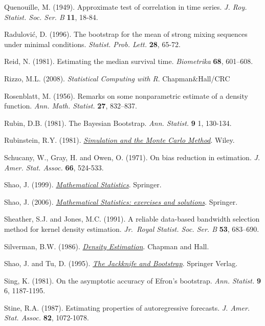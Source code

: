 \documentclass[
]{book}
\theoremstyle{break}
\theoremstyle{nonumberplain}
\begin{document}
Quenouille, M. (1949). Approximate test of correlation in time series.
\emph{J. Roy. Statist. Soc. Ser. B} \textbf{11}, 18-84.

Radulović, D. (1996). The bootstrap for the mean of strong mixing
sequences under minimal conditions. \emph{Statist. Prob. Lett.} \textbf{28},
65-72.

Reid, N. (1981). Estimating the median survival time. \emph{Biometrika}
\textbf{68}, 601--608.

Rizzo, M.L. (2008). \emph{Statistical Computing with R}. Chapman\&Hall/CRC

Rosenblatt, M. (1956). Remarks on some nonparametric estimate of a
density function. \emph{Ann. Math. Statist.} \textbf{27}, 832--837.

Rubin, D.B. (1981). The Bayesian Bootstrap. \emph{Ann. Statist.} \textbf{9} 1,
130-134.

Rubinstein, R.Y. (1981). \href{https://books.google.es/books?hl=es&lr=&id=r2VODQAAQBAJ&oi=fnd&pg=PR1&dq=Simulation+and+the+Monte+Carlo+Method}{\emph{Simulation and the Monte Carlo Method}}. Wiley.

Schucany, W., Gray, H. and Owen, O. (1971). On bias reduction in
estimation. \emph{J. Amer. Stat. Assoc.} \textbf{66}, 524-533.

Shao, J. (1999). \href{https://www.springer.com/gp/book/9780387953823}{\emph{Mathematical Statistics}}. Springer.

Shao, J. (2006). \href{http://www.stewartschultz.com/statistics/books/Mathematical\%20Statistics\%20-\%20Exercises\%20and\%20Solutions.pdf}{\emph{Mathematical Statistics: exercises and solutions}}. Springer.

Sheather, S.J. and Jones, M.C. (1991). A reliable data-based bandwidth
selection method for kernel density estimation.
\emph{Jr.~Royal Statist. Soc. Ser. B} \textbf{53}, 683--690.

Silverman, B.W. (1986). \href{http://users.stat.ufl.edu/~rrandles/sta6934/smhandout.pdf}{\emph{Density Estimation}}. Chapman and Hall.

Shao, J. and Tu, D. (1995). \href{https://books.google.es/books?hl=es&lr=&id=VO3SBwAAQBAJ&oi=fnd&pg=PA1&dq=The+Jackknife+and+Bootstrap}{\emph{The Jackknife and Bootstrap}}. Springer Verlag.

Sing, K. (1981). On the asymptotic accuracy of Efron's bootstrap.
\emph{Ann. Statist.} \textbf{9} 6, 1187-1195.

Stine, R.A. (1987). Estimating properties of autoregressive forecasts.
\emph{J. Amer. Stat. Assoc.} \textbf{82}, 1072-1078.
\end{document}
